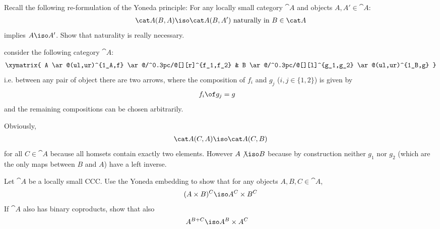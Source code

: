 \begin{exercise}
  Recall the following re-formulation of the Yoneda principle: For any locally small category $\cat A$ and objects $A,A'\in\cat A$:
  \begin{align*}
    \cat A(B,A)\iso \cat  A(B,A')\text{ naturally in } B\in\cat A
  \end{align*}
implies $A\iso A'$. Show that naturality is really necessary.
\end{exercise}
\begin{answer}
consider the following category $\cat A$: 
\begin{align*}
  \xymatrix{
  A \ar@(ul,ur)^{1_A,f} \ar@/^0.3pc/@[][r]^{f_1,f_2} & B \ar@/^0.3pc/@[][l]^{g_1,g_2} \ar@(ul,ur)^{1_B,g}
                                                       } 
  \end{align*}
  i.e. between any pair of object there are two arrows, where the composition of $f_i$ and $g_j$ ($i,j\in\{1,2\}$) is given by
  \begin{align*}
    f_i\of g_j&=g
  \end{align*}
  and the remaining compositions can be chosen arbitrarily.
  
  Obviously,
  \begin{align*}
    \cat A(C,A)\iso\cat A(C,B)
  \end{align*}
  for all $C\in\cat A$ because all homsets contain exactly two elements. However $A\not\iso B$ because by construction neither $g_1$ nor $g_2$ (which are the only maps between $B$ and $A$) have a left inverse.
\end{answer}

\begin{exercise}
  Let $\cat A$ be a locally small CCC. Use the Yoneda embedding to show that for any objects $A,B,C\in\cat A$,
  \begin{align*}
    (A\times B)^C\iso A^C\times B^C
  \end{align*}
  If $\cat A$ also has binary coproducts, show that also
  \begin{align*}
    A^{B+C}&\iso A^B\times A^C
  \end{align*}
\end{exercise}

